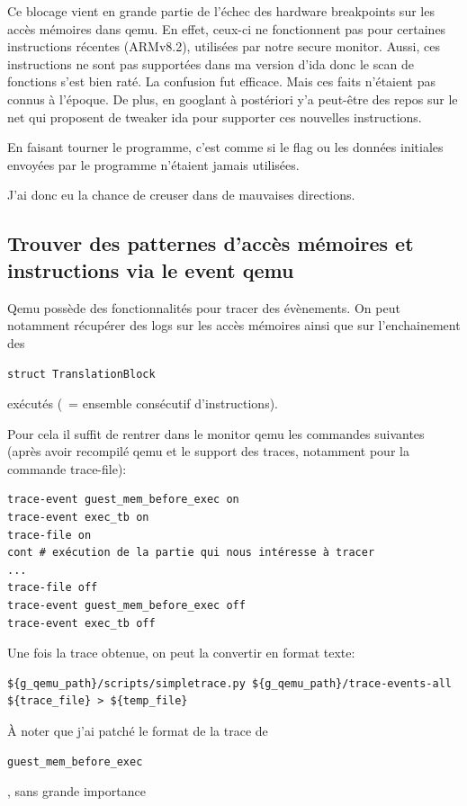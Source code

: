 \documentclass[14pt]{article}
\newcommand{\inlinebox}[2]{%
\colorbox{bg}{%
\parbox[b][0.6em]{\widthof{\texttt{#2}}}{\texttt{#2}}
}
}
\newcommand{\inlinec}[1]{ \inlinebox{c}{#1} }
\newcommand{\inlinetext}[1]{ \inlinebox{text}{#1} }
\theoremstyle{definition}
\begin{document}
Ce blocage vient en grande partie de l'échec des \og hardware \fg breakpoints sur les accès mémoires dans qemu.
En effet, ceux-ci ne fonctionnent pas pour certaines instructions récentes (ARMv8.2), utilisées par notre secure monitor. Aussi, ces instructions ne sont pas supportées dans ma version d'ida donc le scan de fonctions  s'est bien raté. La confusion fut efficace.
Mais ces faits n'étaient pas connus à l'époque. De plus, en googlant à postériori y'a peut-être des repos sur le net qui proposent de tweaker ida pour supporter ces nouvelles instructions.


En faisant tourner le programme, c'est comme si le flag ou les données initiales envoyées par le programme n'étaient jamais utilisées.


J'ai donc eu la chance de creuser dans de mauvaises directions.

\subsection {Trouver des patternes d'accès mémoires et instructions via le event qemu}


Qemu possède des fonctionnalités pour tracer des évènements. On peut notamment récupérer des logs sur les accès mémoires ainsi que sur l'enchainement des \inlinec{struct TranslationBlock} exécutés (~= ensemble consécutif d'instructions).

Pour cela il suffit de rentrer dans le monitor qemu les commandes suivantes (après avoir recompilé qemu et le support des traces, notamment pour la commande trace-file):
\begin{verbatim}
trace-event guest_mem_before_exec on
trace-event exec_tb on
trace-file on
cont # exécution de la partie qui nous intéresse à tracer
...
trace-file off
trace-event guest_mem_before_exec off
trace-event exec_tb off
\end{verbatim}

Une fois la trace obtenue, on peut la convertir en format texte:
\begin{verbatim}
${g_qemu_path}/scripts/simpletrace.py ${g_qemu_path}/trace-events-all  ${trace_file} > ${temp_file}
\end{verbatim}

À noter que j'ai patché le format de la trace de \inlinetext{guest_mem_before_exec}, sans grande importance
\end{document}
